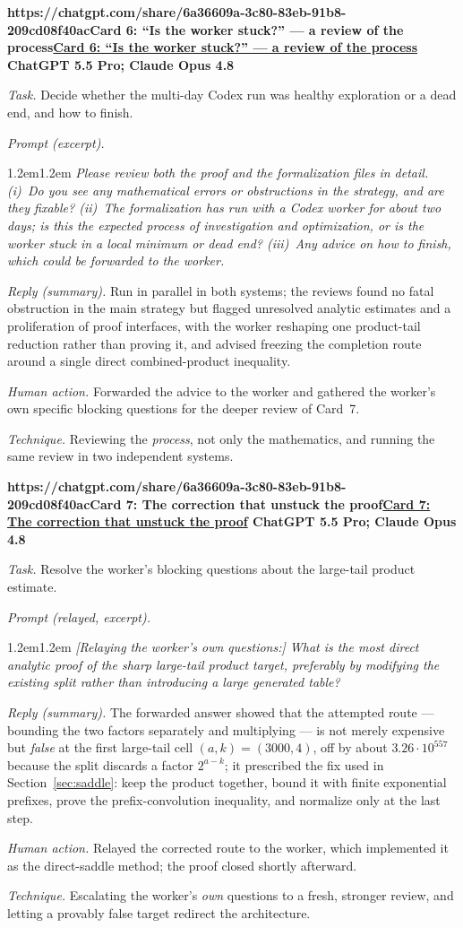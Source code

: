 \documentclass[11pt]{article}
\theoremstyle{definition}
\theoremstyle{remark}
\newenvironment{haicard}[3][]{%
  \par\medskip\noindent
  \begin{lrbox}{\haibox}%
  \begin{minipage}{\dimexpr\linewidth-2\fboxsep-2\fboxrule\relax}%
    \small
    {\sffamily\bfseries
      \def\haiurl{#1}%
      \ifx\haiurl\empty #2\else\href{#1}{\textcolor{cardlink}{#2}}\fi
      \hfill #3}\par\vspace{0.45em}%
}{%
  \end{minipage}%
  \end{lrbox}%
  \fbox{\usebox{\haibox}}%
  \par\medskip
}
\newcommand{\haifield}[1]{\textit{#1.}\enspace\ignorespaces}
\newcommand{\haiprompt}[1]{\par\vspace{0.2em}\leftskip1.2em\rightskip1.2em\relax
  \small\itshape #1\par\leftskip0pt\rightskip0pt\vspace{0.2em}}
\begin{document}
\begin{haicard}[https://chatgpt.com/share/6a36609a-3c80-83eb-91b8-209cd08f40ac]{Card 6: ``Is the worker stuck?'' --- a review of the process}{ChatGPT 5.5 Pro; Claude Opus 4.8}
\haifield{Task} Decide whether the multi-day Codex run was healthy exploration
or a dead end, and how to finish.\par
\haifield{Prompt (excerpt)} \haiprompt{Please review both the proof and the
formalization files in detail. (i)~Do you see any mathematical errors or
obstructions in the strategy, and are they fixable? (ii)~The formalization has
run with a Codex worker for about two days; is this the expected process of
investigation and optimization, or is the worker stuck in a local minimum or
dead end? (iii)~Any advice on how to finish, which could be forwarded to the
worker.}
\haifield{Reply (summary)} Run in parallel in both systems; the reviews found no
fatal obstruction in the main strategy but flagged unresolved analytic estimates
and a proliferation of proof interfaces, with the worker reshaping one
product-tail reduction rather than proving it, and advised freezing the
completion route around a single direct combined-product inequality.\par
\haifield{Human action} Forwarded the advice to the worker and gathered the
worker's own specific blocking questions for the deeper review of Card~7.\par
\haifield{Technique} Reviewing the \emph{process}, not only the mathematics, and
running the same review in two independent systems.\par
\end{haicard}

\begin{haicard}[https://chatgpt.com/share/6a36609a-3c80-83eb-91b8-209cd08f40ac]{Card 7: The correction that unstuck the proof}{ChatGPT 5.5 Pro; Claude Opus 4.8}
\haifield{Task} Resolve the worker's blocking questions about the large-tail
product estimate.\par
\haifield{Prompt (relayed, excerpt)} \haiprompt{[Relaying the worker's own
questions:] What is the most direct analytic proof of the sharp large-tail
product target, preferably by modifying the existing split rather than
introducing a large generated table?}
\haifield{Reply (summary)} The forwarded answer showed that the attempted route
--- bounding the two factors separately and multiplying --- is not merely
expensive but \emph{false} at the first large-tail cell $(a,k)=(3000,4)$, off by
about $3.26\cdot10^{557}$ because the split discards a factor $2^{a-k}$; it
prescribed the fix used in Section~\ref{sec:saddle}: keep the product together,
bound it with finite exponential prefixes, prove the prefix-convolution
inequality, and normalize only at the last step.\par
\haifield{Human action} Relayed the corrected route to the worker, which
implemented it as the direct-saddle method; the proof closed shortly
afterward.\par
\haifield{Technique} Escalating the worker's \emph{own} questions to a fresh,
stronger review, and letting a provably false target redirect the
architecture.\par
\end{haicard}
\end{document}

